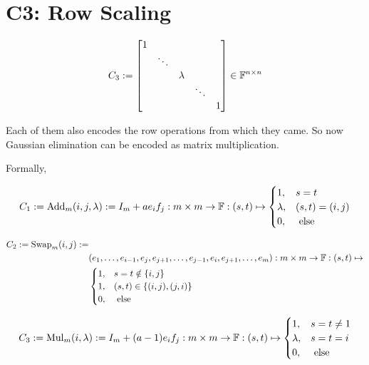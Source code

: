 \section{C3: Row Scaling}

\[
    C_3 :=
    \begin{bmatrix}
        1 &        &         &        &   \\
          & \ddots &         &        &   \\
          &        & \lambda &        &   \\
          &        &         & \ddots &   \\
          &        &         &        & 1 \\
    \end{bmatrix}
    \in \mathbb{F}^{n \times n}
\]

Each of them also encodes the row operations from which they came.
So now Gaussian elimination can be encoded as matrix multiplication.

Formally,

\[
    C_1:= \text{Add}_m (i, j, \lambda) := I_m + a e_i f_j: m \times m \to \mathbb{F} : (s,t) \mapsto 
    \begin{cases}
        1, & s = t \\ 
        \lambda, & (s,t) = (i,j) \\ 
        0, &\text{ else} 
    \end{cases}
\]

\begin{align*}
     C_2:= \text{Swap}_m (i,j) :=&  \\ 
    & (e_1, \dots, e_{i - 1}, e_j, e_{j + 1}, \dots, e_{j - 1}, e_i, e_{j + 1}, \dots, e_m): m \times m \to \mathbb{F} : (s,t) \mapsto \\
    &\begin{cases}
        1, & s = t \notin \{i, j\} \\ 
        1, & (s, t) \in \{(i,j), (j,i)\}\\ 
        0, &\text{ else} 
    \end{cases}   
\end{align*}

\[
    C_3:= \text{Mul}_m (i,\lambda) := I_m + (a - 1) e_i f_j: m \times m \to \mathbb{F} : (s,t) \mapsto 
    \begin{cases}
        1, & s = t  \ne 1 \\ 
        \lambda, & s = t = i \\ 
        0, &\text{ else} 
    \end{cases}
\]

